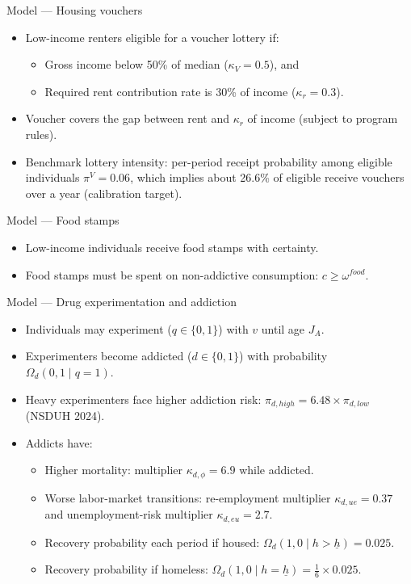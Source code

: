\documentclass[10pt,aspectratio=169]{beamer}
\newcommand{\drug}{v}          %
\newcommand{\nondrug}{c}       %
\newcommand{\house}{h}         %
\begin{document}
\begin{frame}{Model --- Housing vouchers}
\begin{itemize}
\item Low-income renters eligible for a voucher lottery if:
\begin{itemize}
\item Gross income below 50\% of median ($\kappa_V=0.5$), and
\item Required rent contribution rate is 30\% of income ($\kappa_r=0.3$).
\end{itemize}
\item Voucher covers the gap between rent and $\kappa_r$ of income (subject to program rules).
\item Benchmark lottery intensity: per-period receipt probability among eligible individuals $\pi^{V}=0.06$,
which implies about 26.6\% of eligible receive vouchers over a year (calibration target).
\end{itemize}
\end{frame}

\begin{frame}{Model --- Food stamps}
\begin{itemize}
\item Low-income individuals receive food stamps with certainty.
\item Food stamps must be spent on non-addictive consumption: $\nondrug \ge \omega^{food}$.
\end{itemize}
\end{frame}

\begin{frame}{Model --- Drug experimentation and addiction}
\begin{itemize}
\item Individuals may experiment ($q\in\{0,1\}$) with $\drug$ until age $J_A$.
\item Experimenters become addicted ($d\in\{0,1\}$) with probability $\Omega_d(0,1\mid q=1)$.
\item Heavy experimenters face higher addiction risk: $\pi_{d,high}=6.48\times\pi_{d,low}$ (NSDUH 2024).
\item Addicts have:
\begin{itemize}
\item Higher mortality: multiplier $\kappa_{d,\phi}=6.9$ while addicted.
\item Worse labor-market transitions: re-employment multiplier $\kappa_{d,ue}=0.37$ and unemployment-risk multiplier $\kappa_{d,eu}=2.7$.
\item Recovery probability each period if housed: $\Omega_d(1,0\mid \house>\underline{h})=0.025$.
\item Recovery probability if homeless: $\Omega_d(1,0\mid \house=\underline{h})=\tfrac{1}{6}\times 0.025$.
\end{itemize}
\end{itemize}
\end{frame}
\end{document}
